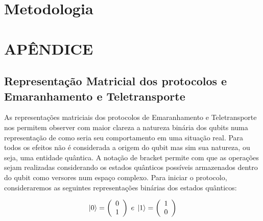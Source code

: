 \documentclass[11pt,oneside,brazil,hidelinks,article,sumario=tradicional,a4paper]{abntex2}
\begin{document}
%
%
%
%

\section{Metodologia}

\section{APÊNDICE}

\subsection{Representação Matricial dos protocolos e Emaranhamento e Teletransporte}

As representações matriciais dos protocolos de Emaranhamento e Teletransporte nos permitem observer com maior clareza a natureza binária dos qubits numa representação de como seria seu comportamento em uma situação real. Para todos os efeitos não é considerada a origem do qubit mas sim sua natureza, ou seja, uma entidade quântica. A notação de bracket permite com que as operações sejam realizadas considerando os estados quânticos possíveis armazenados dentro do qubit como versores num espaço complexo.
Para iniciar o protocolo, consideraremos as seguintes representações binárias dos estados quânticos:

\begin{equation} \label{01}
\ket{0} = \left(\begin{array}{l}
0 \\
1
\end{array}\right) \; e \;
\ket{1} = \left(\begin{array}{l}
1 \\
0
\end{array}\right)
\end{equation}
\end{document}
